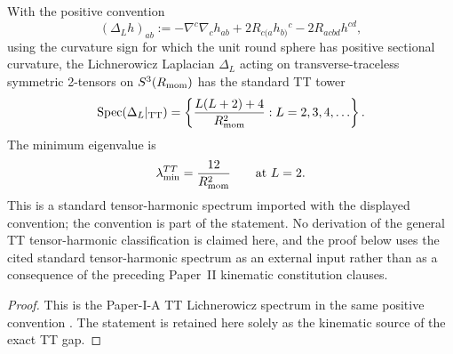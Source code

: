 \documentclass[12pt,a4paper]{article}
\begin{document}
\begin{theorem}
\label{p2:thm:spin2-spectrum}
With the positive convention
\[
(\Delta_L h)_{ab}:=-\nabla^c\nabla_c h_{ab}+2R_{c(a}h_{b)}{}^c-2R_{acbd}h^{cd},
\]
using the curvature sign for which the unit round sphere has positive sectional curvature, the Lichnerowicz Laplacian $\Delta_L$ acting on transverse-traceless symmetric 
2-tensors on $S^3(R_{\mathrm{mom}})$ has the standard TT tower
\begin{equation}
\mathrm{Spec}(\Delta_L|_{\mathrm{TT}})
=
\left\{
\frac{L(L+2)+4}{R_{\mathrm{mom}}^2}:L=2,3,4,\ldots
\right\}.
\end{equation}
The minimum eigenvalue is
\begin{equation}
\lambda_{\min}^{TT}=\frac{12}{R_{\mathrm{mom}}^2}
\qquad\text{at }L=2.
\end{equation}
This is a standard tensor-harmonic spectrum imported with the displayed convention; the convention is part of the statement.  No derivation of the general TT tensor-harmonic classification is claimed here, and the proof below uses the cited standard tensor-harmonic spectrum as an external input rather than as a consequence of the preceding Paper~II kinematic constitution clauses.
\end{theorem}

\begin{proof}
This is the Paper-I-A TT Lichnerowicz spectrum in the same positive convention
\cite{Kugelmann2026a}.  The statement is retained here solely as the
kinematic source of the exact TT gap.
\end{proof}
\end{document}

